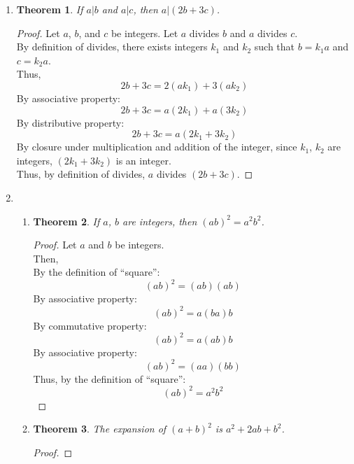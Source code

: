 \documentclass{article}
\newtheorem*{theorem*}{Theorem}
\begin{document}
\begin{enumerate}
        \item 
        \begin{theorem*}
            If $a|b$ and $a|c$, then $a|(2b + 3c)$.
        \end{theorem*}
        \begin{proof}
            Let $a$, $b$, and $c$ be integers. Let $a$ divides $b$ and $a$ divides $c$.\\
            By definition of divides, there exists integers $k_1$ and $k_2$ such that $b = k_1a$ and $c = k_2a$.\\
            Thus,
            \[2b + 3c = 2(ak_1) + 3(ak_2)\]
            By associative property:
            \[2b + 3c = a(2k_1) + a(3k_2)\]
            By distributive property:
            \[2b + 3c = a(2k_1 + 3k_2)\]
            By closure under multiplication and addition of the integer, since $k_1$, $k_2$ are integers, $(2k_1 + 3k_2)$ is an integer.\\
            Thus, by definition of divides, $a$ divides $(2b + 3c)$.
        \end{proof}

        \item 
        \begin{enumerate}
            \item 
            \begin{theorem*}
                If $a$, $b$ are integers, then $(ab) ^ 2 = a ^ 2 b ^ 2$.
            \end{theorem*}
            \begin{proof}
                Let $a$ and $b$ be integers.\\
                Then,\\
                By the definition of ``square'':
                \[(ab) ^ 2 = (ab)(ab)\]
                By associative property:
                \[(ab) ^ 2 = a(ba)b\]
                By commutative property:
                \[(ab) ^ 2 = a(ab)b\]
                By associative property:
                \[(ab) ^ 2 = (aa)(bb)\]
                Thus, by the definition of ``square'':
                \[(ab) ^ 2 = a ^ 2 b ^ 2\]

            \end{proof}
            \item
            \begin{theorem*}
                The expansion of $(a + b) ^ 2$ is $a ^ 2 + 2ab + b ^ 2$.
            \end{theorem*}
            \begin{proof}


\end{proof}
\end{enumerate}
\end{enumerate}
\end{document}
